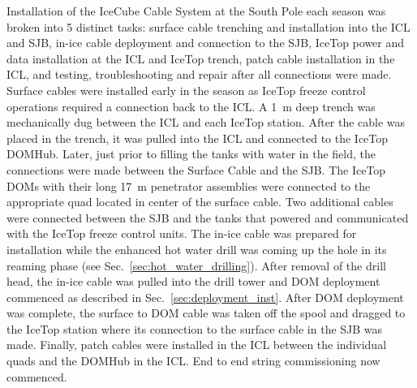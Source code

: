 Installation of the IceCube Cable System at the South Pole each season was
broken into 5 distinct tasks: surface cable trenching and
installation into the ICL and SJB, in-ice cable deployment and
connection to the SJB, IceTop power and data installation at the ICL and
IceTop trench, patch cable installation in the ICL, and testing,
troubleshooting and repair after all connections were made. Surface cables
were installed early in the season as IceTop freeze control operations
required a connection back to the ICL. A 1~m deep trench was mechanically
dug between the ICL and each IceTop station. After the cable was placed in
the trench, it was pulled into the ICL and connected to the IceTop
DOMHub. Later, just prior to filling the tanks with water in the field, the
connections were made between the Surface Cable and the SJB. The IceTop
DOMs with their long 17~m penetrator assemblies were connected to the
appropriate quad located in center of the surface cable. Two additional
cables were connected between the SJB and the tanks that powered and
communicated with the IceTop freeze control units. The in-ice cable
was prepared for installation while the enhanced hot water drill was coming
up the hole in its reaming phase (see Sec.~\ref{sec:hot_water_drilling}). After removal of the drill head, the
in-ice cable was pulled into the drill tower and DOM deployment
commenced as described in Sec.~\ref{sec:deployment_inst}. After DOM deployment was complete, the
surface to DOM cable was taken off the spool and dragged to the IceTop
station where its connection to the surface cable in the SJB was
made. Finally, patch cables were installed in the ICL between the
individual quads and the DOMHub in the ICL. End to end string commissioning
now commenced.
